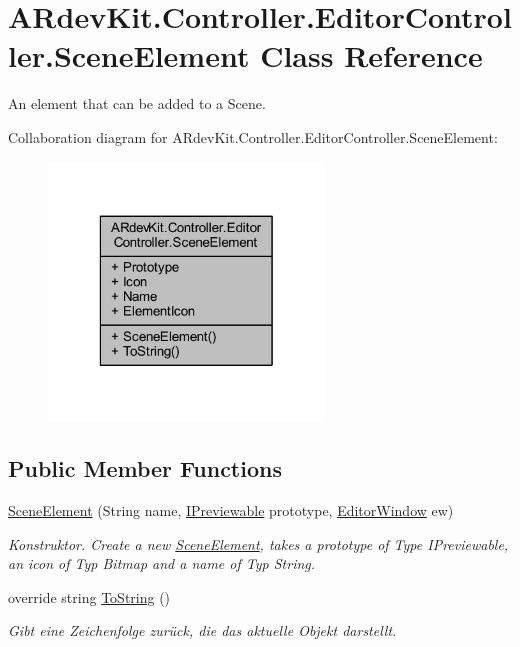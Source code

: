 \hypertarget{class_a_rdev_kit_1_1_controller_1_1_editor_controller_1_1_scene_element}{\section{A\-Rdev\-Kit.\-Controller.\-Editor\-Controller.\-Scene\-Element Class Reference}
\label{class_a_rdev_kit_1_1_controller_1_1_editor_controller_1_1_scene_element}
}


An element that can be added to a Scene.  




Collaboration diagram for A\-Rdev\-Kit.\-Controller.\-Editor\-Controller.\-Scene\-Element\-:
\nopagebreak
\begin{figure}[H]
\begin{center}
\leavevmode
\includegraphics[width=208pt]{class_a_rdev_kit_1_1_controller_1_1_editor_controller_1_1_scene_element__coll__graph}
\end{center}
\end{figure}
\subsection*{Public Member Functions}
\begin{DoxyCompactItemize}
\item 
\hyperlink{class_a_rdev_kit_1_1_controller_1_1_editor_controller_1_1_scene_element_a1d05fa2da81d1d76ad731faa1f41af7d}{Scene\-Element} (String name, \hyperlink{interface_a_rdev_kit_1_1_model_1_1_project_1_1_i_previewable}{I\-Previewable} prototype, \hyperlink{class_a_rdev_kit_1_1_editor_window}{Editor\-Window} ew)
\begin{DoxyCompactList}\small\item\em Konstruktor. Create a new \hyperlink{class_a_rdev_kit_1_1_controller_1_1_editor_controller_1_1_scene_element}{Scene\-Element}, takes a prototype of Type I\-Previewable, an icon of Typ Bitmap and a name of Typ String. \end{DoxyCompactList}\item 
override string \hyperlink{class_a_rdev_kit_1_1_controller_1_1_editor_controller_1_1_scene_element_aa2d13ffbc17d243e5288c8dadf878c77}{To\-String} ()
\begin{DoxyCompactList}\small\item\em Gibt eine Zeichenfolge zurück, die das aktuelle Objekt darstellt. \end{DoxyCompactList}\end{DoxyCompactItemize}
